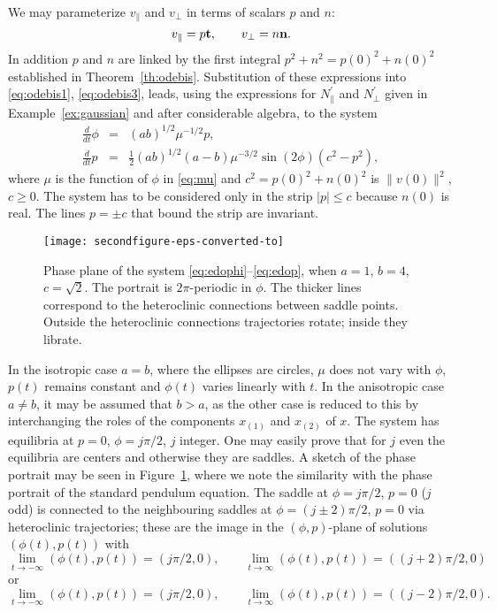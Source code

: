 \documentclass[10pt]{article}
\newcommand{\Npperp}{N^\prime_\perp}
\newcommand{\Nppar}{N^\prime_\|}
\newcommand{\vperp}{v_\perp}
\newcommand{\vpar}{v_\|}
\begin{document}
We may parameterize \(\vpar\) and \(\vperp\) in terms of scalars \(p\) and \(n\):
\[
\vpar = p{\bf t},\qquad \vperp = n {\bf n}.
\]
In addition \(p\) and \(n\) are linked by the first integral \(p^2+n^2 = p(0)^2+n(0)^2\) established in Theorem~\ref{th:odebis}. Substitution of these expressions into \eqref{eq:odebis1}, \eqref{eq:odebis3}, leads, using the expressions for \(\Nppar\) and \(\Npperp\) given in Example~\ref{ex:gaussian} and after considerable algebra, to the system
\begin{eqnarray}\label{eq:edophi}
\frac{d}{dt} \phi& = &(ab)^{1/2} \mu^{-1/2} p,\\
%
\label{eq:edop}
\frac{d}{dt} p& =& \frac{1}{2} (ab)^{1/2} (a-b) \mu^{-3/2} \sin(2\phi) (c^2-p^2),
\end{eqnarray}
where \(\mu\) is the function of \(\phi\) in \eqref{eq:mu} and \(c^2 = p(0)^2+n(0)^2\) is \(\|v(0)\|^2\), \(c \geq 0\). The system has to be considered only in the strip \(|p|\leq c\) because \(n(0)\) is real. The  lines \(p=\pm c\) that bound the strip are invariant.
\begin{figure}[t]
	\centering
	\texttt{[image: secondfigure-eps-converted-to]}
	\caption{Phase plane of the system \eqref{eq:edophi}--\eqref{eq:edop}, when \(a=1\), \(b=4\), \(c=\sqrt{2}\). The portrait is \(2\pi\)-periodic in \(\phi\). The thicker lines correspond to the heteroclinic connections between saddle points. Outside the heteroclinic connections trajectories rotate; inside they librate.}
	\label{fig:phaseportrait}
\end{figure}


In the isotropic case \(a=b\), where the ellipses are circles, \(\mu\) does not vary with \(\phi\), \(p(t)\) remains constant and \(\phi(t)\) varies linearly with \(t\).  In the anisotropic case \(a\neq b\), it may be assumed that \(b>a\), as the other case is reduced to this by interchanging the roles of the components \(x_{(1)}\) and \(x_{(2)}\) of \(x\).
The system has equilibria at \(p=0\), \(\phi = j\pi/2\), \(j\) integer. One may easily prove that for \(j\) even the equilibria are centers and otherwise they are saddles.
A sketch of the phase portrait  may be seen in Figure~\ref{fig:phaseportrait}, where we note the similarity with the phase portrait of the standard pendulum equation. The saddle at  \(\phi = j\pi/2\), \(p=0\) (\(j\) odd) is connected to the neighbouring saddles at \(\phi = (j\pm2)\pi/2\), \(p=0\) via heteroclinic trajectories;
these are the image in the \((\phi,p)\)-plane of solutions \((\phi(t),p(t))\) with \[\lim_{t\rightarrow -\infty}(\phi(t),p(t))  = (j\pi/2,0),\qquad \lim_{t\rightarrow \infty}(\phi(t),p(t))  = ((j+2)\pi/2,0)  \]
or
\[\lim_{t\rightarrow -\infty}(\phi(t),p(t))  = (j\pi/2,0),\qquad \lim_{t\rightarrow \infty}(\phi(t),p(t))  = ((j-2)\pi/2,0).  \]
\end{document}
